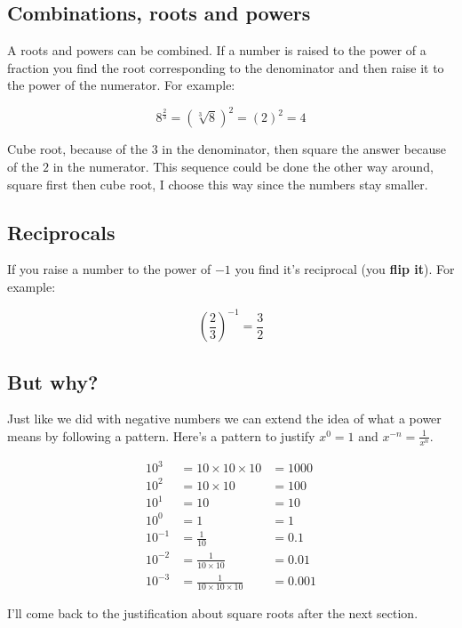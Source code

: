 \documentclass[
  a4paper,
]{scrbook}
\begin{document}
\subsection{Combinations, roots and
powers}\label{combinations-roots-and-powers}

A roots and powers can be combined. If a number is raised to the power
of a fraction you find the root corresponding to the denominator and
then raise it to the power of the numerator. For example:

\[
8^{\frac{2}{3}} = (\sqrt[3]{8})^2 = (2)^2 = 4
\]

Cube root, because of the \(3\) in the denominator, then square the
answer because of the \(2\) in the numerator. This sequence could be
done the other way around, square first then cube root, I choose this
way since the numbers stay smaller.

\subsection{Reciprocals}\label{reciprocals}

If you raise a number to the power of \(-1\) you find it's reciprocal
(you \textbf{flip it}). For example:

\[
\left(\frac{2}{3}\right)^{-1} = \frac{3}{2}
\]

\subsection{But why?}\label{but-why-1}

Just like we did with negative numbers we can extend the idea of what a
power means by following a pattern. Here's a pattern to justify
\(x^0 = 1\) and \(x^{-n} = \frac{1}{x^n}\).

\[
\begin{aligned} 10^3 &= 10 \times 10 \times 10 & = 1000 \\
10^2 &= 10 \times 10 & = 100 \\
10^1 &= 10 & = 10 \\
10^0 &= 1 & = 1 \\
10^{-1} &= \frac{1}{10} & = 0.1 \\
10^{-2} &= \frac{1}{10 \times 10} & = 0.01 \\
10^{-3} &= \frac{1}{10 \times 10 \times 10} & = 0.001 
\end{aligned}
\]

I'll come back to the justification about square roots after the next
section.
\end{document}
